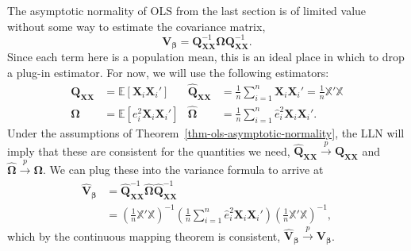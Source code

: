 \documentclass[
  13pt,
  letterpaper,
  DIV=11,
  numbers=noendperiod]{scrreprt}
\newcommand{\mb}{\bm}
\newcommand{\E}{\mathbb{E}}
\newcommand{\X}{\mb{X}}
\newcommand{\Xmat}{\mathbb{X}}
\newcommand{\bfbeta}{\mb{\beta}}
\newcommand{\inprob}{\overset{p}{\to}}
\theoremstyle{plain}
\theoremstyle{plain}
\theoremstyle{definition}
\theoremstyle{definition}
\theoremstyle{remark}
\begin{document}
The asymptotic normality of OLS from the last section is of limited
value without some way to estimate the covariance matrix, \[ 
\mb{V}_{\bfbeta} = \mb{Q}_{\X\X}^{-1}\mb{\Omega}\mb{Q}_{\X\X}^{-1}.
\] Since each term here is a population mean, this is an ideal place in
which to drop a plug-in estimator. For now, we will use the following
estimators: \[ 
\begin{aligned}
  \mb{Q}_{\X\X} &= \E[\X_{i}\X_{i}'] & \widehat{\mb{Q}}_{\X\X} &= \frac{1}{n} \sum_{i=1}^{n} \X_{i}\X_{i}' = \frac{1}{n}\Xmat'\Xmat \\
  \mb{\Omega} &= \E[e_i^2\X_i\X_i'] & \widehat{\mb{\Omega}} & = \frac{1}{n}\sum_{i=1}^n\widehat{e}_i^2\X_i\X_i'.
\end{aligned}
\] Under the assumptions of Theorem~\ref{thm-ols-asymptotic-normality},
the LLN will imply that these are consistent for the quantities we need,
\(\widehat{\mb{Q}}_{\X\X} \inprob \mb{Q}_{\X\X}\) and
\(\widehat{\mb{\Omega}} \inprob \mb{\Omega}\). We can plug these into
the variance formula to arrive at \[ 
\begin{aligned}
  \widehat{\mb{V}}_{\bfbeta} &= \widehat{\mb{Q}}_{\X\X}^{-1}\widehat{\mb{\Omega}}\widehat{\mb{Q}}_{\X\X}^{-1} \\
  &= \left( \frac{1}{n} \Xmat'\Xmat \right)^{-1} \left( \frac{1}{n} \sum_{i=1}^n\widehat{e}_i^2\X_i\X_i' \right) \left( \frac{1}{n} \Xmat'\Xmat \right)^{-1},
\end{aligned}
\] which by the continuous mapping theorem is consistent,
\(\widehat{\mb{V}}_{\bfbeta} \inprob \mb{V}_{\bfbeta}\).
\end{document}
